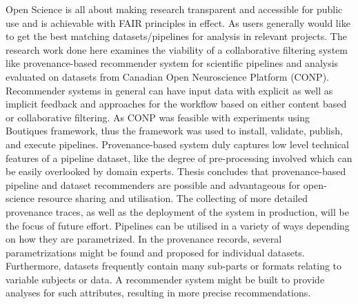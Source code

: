 \documentclass[12pt,letterpaper]{report}
\begin{document}
Open Science is all about making research transparent and accessible for public use and is achievable with FAIR principles in effect. As users generally would like to get the best matching datasets/pipelines for analysis in relevant projects. The research work done here examines the viability of a collaborative filtering system like provenance-based recommender system for scientific pipelines and analysis evaluated on datasets from Canadian Open Neuroscience Platform (CONP). Recommender systems in general can have input data with explicit as well as implicit feedback and approaches for the workflow based on either content based or collaborative filtering. As CONP was feasible with experiments using Boutiques framework, thus the framework was used to install, validate, publish, and execute pipelines. Provenance-based system duly captures low level technical features of a pipeline dataset, like the degree of pre-processing involved which can be easily overlooked by domain experts. Thesis concludes that provenance-based pipeline and dataset recommenders are possible and advantageous for open-science resource sharing and utilisation. The collecting of more detailed provenance traces, as well as the deployment of the system in production, will be the focus of future effort. Pipelines can be utilised in a variety of ways depending on how they are parametrized. In the provenance records, several parametrizations might be found and proposed for individual datasets. Furthermore, datasets frequently contain many sub-parts or formats relating to variable subjects or data. A recommender system might be built to provide analyses for such attributes, resulting in more precise recommendations.
\end{document}
